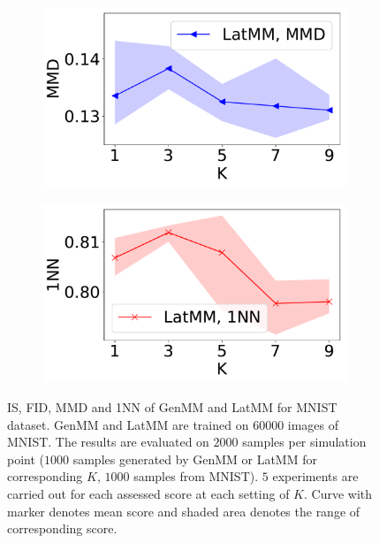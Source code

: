 \begin{figure}[!tp]
\begin{subfigure}{.24\textwidth}
  \end{subfigure}
  \centering
  \begin{subfigure}{.24\textwidth}
    \centering
    \includegraphics[width=1\linewidth]{images/mnist/scores/std1EMGM-SM/EMGM-SM-MMD-K.pdf}
  \end{subfigure}
  \begin{subfigure}{0.24\textwidth}
    \centering
    \includegraphics[width=1.\linewidth]{images/mnist/scores/std1EMGM-SM/EMGM-SM-1NN-K.pdf}
  \end{subfigure}
  \caption{IS, FID, MMD and 1NN of GenMM and LatMM for MNIST dataset. GenMM and LatMM are trained on $60000$ images of MNIST. The results are evaluated on $2000$ samples per simulation point ($1000$ samples generated by GenMM or LatMM for corresponding $K$, $1000$ samples from MNIST). $5$ experiments are carried out for each assessed score at each setting of $K$. Curve with marker denotes mean score and shaded area denotes the range of corresponding score.}\label{fig-scores-k}
\end{figure}

